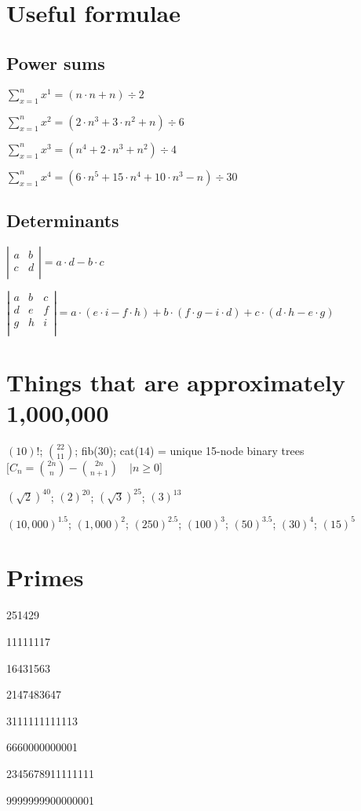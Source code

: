 \section {Useful formulae}
  
  \subsection {Power sums}
    $ {\sum^n_{x=1} x^1} = (n \cdot n + n) \div 2 $

    $ {\sum^n_{x=1} x^2} = (2 \cdot n^3 + 3 \cdot n^2 + n) \div 6 $

    $ {\sum^n_{x=1} x^3} = (n^4 + 2 \cdot n^3 + n^2) \div 4 $

    $ {\sum^n_{x=1} x^4} = (6 \cdot n^5 + 15 \cdot n^4 + 10 \cdot n^3 - n) \div 30 $

  \subsection {Determinants}
    $ \left| \begin{array}{cc} a & b \\ c & d \\ \end{array} \right| = a \cdot d - b \cdot c $
    
    $ \left| \begin{array}{ccc} a & b & c \\ d & e & f \\ g & h & i \\ \end{array} \right| = a \cdot (e \cdot i - f \cdot h) + b \cdot (f \cdot g - i \cdot d) + c \cdot (d \cdot h - e \cdot g) $

\section {Things that are approximately 1,000,000}

  $ (10)! $;
  $ {22} \choose {11} $;
    fib($ 30 $);
    cat($ 14 $) = unique 15-node binary trees $ \Big[ C_n = {2n \choose n} - {2n\choose n+1} \quad | n \ge 0 \Big] $

  $ (\sqrt{2})^{40} $;
  $ (2)^{20} $;
  $ (\sqrt{3})^{25} $;
  $ (3)^{13} $

  $ (10,000)^{1.5} $;
  $ (1,000)^{2} $;
  $ (250)^{2.5} $;
  $ (100)^{3} $;
  $ (50)^{3.5} $;
  $ (30)^{4} $;
  $ (15)^{5} $

\section {Primes}
  251429

  11111117

  16431563

  2147483647

  3111111111113

  6660000000001

  2345678911111111

  9999999900000001
